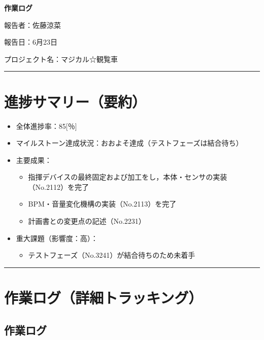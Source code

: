 \documentclass[uplatex,dvipdfmx,a4paper,11pt]{jsarticle}
\newcommand{\sectionrule}{\par\medskip\noindent\rule{\linewidth}{0.6pt}\par\medskip}
\begin{document}
{\LARGE\bfseries 作業ログ}\par\bigskip

報告者：佐藤涼菜

報告日：6月23日

プロジェクト名：マジカル☆観覧車

\sectionrule


\section{進捗サマリー（要約）}

\begin{itemize}
  \item 全体進捗率：85[％]
  \item マイルストーン達成状況：おおよそ達成（テストフェーズは結合待ち）
  \item 主要成果：
    \begin{itemize}
      \item {指揮デバイスの最終固定および加工をし，本体・センサの実装（No.2112）を完了}
      \item {BPM・音量変化機構の実装（No.2113）を完了}
      \item {計画書との変更点の記述（No.2231）}
    \end{itemize}
  \item 重大課題（影響度：高）：
    \begin{itemize}
      \item {テストフェーズ（No.3241）が結合待ちのため未着手}
    \end{itemize}
\end{itemize}

\sectionrule


\section{作業ログ（詳細トラッキング）}

\subsection{作業ログ}

\renewcommand{\arraystretch}{1.2}

\small
\end{document}
